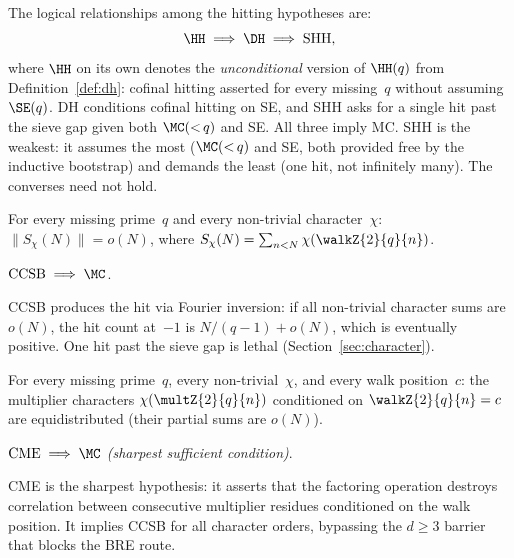 \begin{remark}\label{rem:shh-vs-dh}
The logical relationships among the hitting hypotheses are:
\[
  \HH \;\Longrightarrow\; \DH \;\Longrightarrow\; \mathrm{SHH},
\]
where $\HH$ on its own denotes the \emph{unconditional} version of
$\HH(q)$ from Definition~\ref{def:dh}: cofinal hitting asserted for
every missing~$q$ without assuming $\SE(q)$.
DH conditions cofinal hitting on SE, and SHH asks for a
single hit past the sieve gap given both $\MC({<}\,q)$ and SE\@.
All three imply MC\@.  SHH is the weakest: it assumes the most
($\MC({<}\,q)$ and SE, both provided free by the inductive bootstrap)
and demands the least (one hit, not infinitely many).
The converses need not hold.
\end{remark}

\begin{property}\label{def:ccsb-intro}
For every missing prime~$q$ and every non-trivial character~$\chi$:
$\|S_\chi(N)\| = o(N)$, where
$S_\chi(N) = \sum_{n<N}\chi(\walkZ{2}{q}{n})$.
\end{property}

\begin{theorem}
\label{thm:ccsb-mc-intro}
$\mathrm{CCSB} \;\Longrightarrow\; \MC$.
\end{theorem}

CCSB produces the hit via Fourier inversion: if all non-trivial
character sums are $o(N)$, the hit count at~$-1$ is
$N/(q{-}1) + o(N)$, which is eventually positive.  One hit past
the sieve gap is lethal (Section~\ref{sec:character}).

\begin{property}\label{def:cme-intro}
For every missing prime~$q$, every non-trivial~$\chi$, and every walk
position~$c$: the multiplier characters
$\chi(\multZ{2}{q}{n})$ conditioned on $\walkZ{2}{q}{n} = c$ are equidistributed
(their partial sums are $o(N)$).
\end{property}

\begin{theorem}
\label{thm:cme-mc-intro}
$\mathrm{CME} \;\Longrightarrow\; \MC$ \emph{(sharpest sufficient condition)}.
\end{theorem}

CME is the sharpest hypothesis: it asserts that the factoring
operation destroys correlation between consecutive multiplier residues
conditioned on the walk position.  It implies CCSB for all character
orders, bypassing the $d \geq 3$ barrier that blocks the
BRE route.

